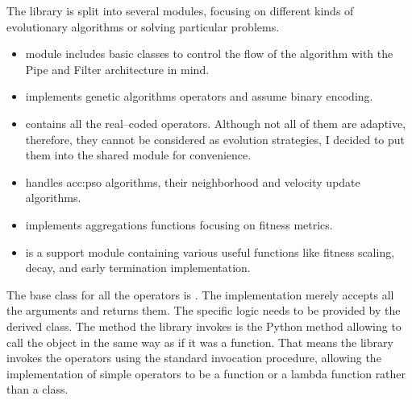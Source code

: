 The library is split into several modules, focusing on different kinds of evolutionary algorithms or solving particular problems.
\begin{itemize}
    \item {} module includes basic classes to control the flow of the algorithm with the Pipe and Filter architecture in mind.
    \item {} implements genetic algorithms operators and assume binary encoding.
    \item {} contains all the real--coded operators. Although not all of them are adaptive, therefore, they cannot be considered as evolution strategies, I decided to put them into the shared module for convenience.
    \item {} handles \acrlong{acc:pso} algorithms, their neighborhood and velocity update algorithms.
    \item {} implements aggregations functions focusing on fitness metrics.
    \item {} is a support module containing various useful functions like fitness scaling, decay, and early termination implementation.
\end{itemize}

The base class for all the operators is . The implementation merely accepts all the arguments and returns them. The specific logic needs to be provided by the derived class. The method the library invokes is the Python  method allowing to call the object in the same way as if it was a function. That means the library invokes the operators using the standard invocation procedure, allowing the implementation of simple operators to be a function or a lambda function rather than a class.

